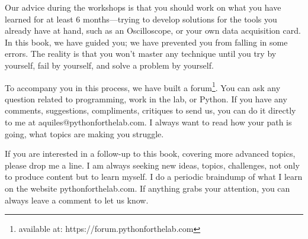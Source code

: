 Our advice during the workshops is that you should work on what you have learned for at least 6 months—trying to develop solutions for the tools you already have at hand, such as an Oscilloscope, or your own data acquisition card. In this book, we have guided you; we have prevented you from falling in some errors. The reality is that you won't master any technique until you try by yourself, fail by yourself, and solve a problem by yourself.

To accompany you in this process, we have built a forum\footnote{available at: https://forum.pythonforthelab.com}.  You can ask any question related to programming, work in the lab, or Python. If you have any comments, suggestions, compliments, critiques to send us, you can do it directly to me at aquiles@pythonforthelab.com. I always want to read how your path is going, what topics are making you struggle.

If you are interested in a follow-up to this book, covering more advanced topics, please drop me a line. I am always seeking new ideas, topics, challenges, not only to produce content but to learn myself. I do a periodic braindump of what I learn on the website pythonforthelab.com. If anything grabs your attention, you can always leave a comment to let us know.
